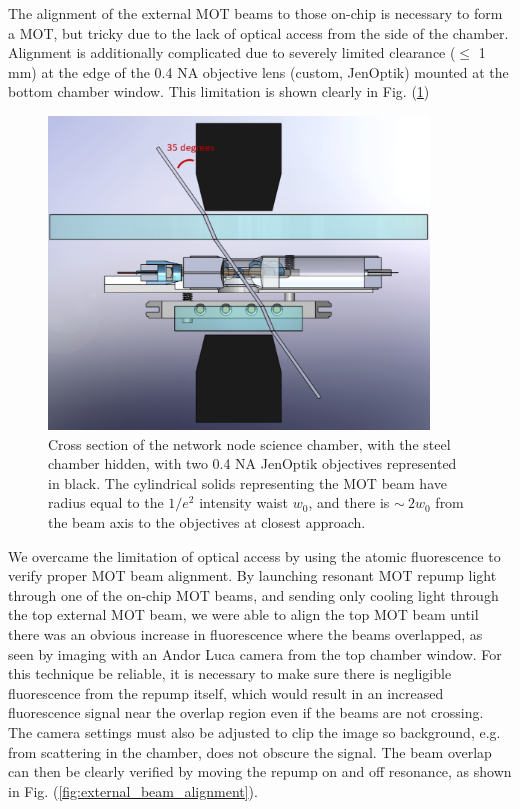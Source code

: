 The alignment of the external MOT beams to those on-chip is necessary to form a MOT,
but tricky due to the lack of optical access from the side of the chamber. Alignment is additionally complicated due to severely limited clearance ($\leq$ 1 mm) at the edge of the 0.4 NA objective lens (custom, JenOptik) mounted at the bottom chamber window. This limitation is shown clearly in Fig. (\ref{fig:chamber_cross_section})
\begin{figure}[!ht]
    \centering
    \includegraphics[width=0.9\textwidth]{Images/chamber_cross_section.pdf}
    \caption{Cross section of the network node science chamber, with the steel chamber hidden, with two 0.4 NA JenOptik objectives represented in black. The cylindrical solids representing the MOT beam have radius equal to the $1/e^2$ intensity waist $w_0$, and there is $\sim~2w_0$ from the beam axis to the objectives at closest approach.}
    \label{fig:chamber_cross_section}
\end{figure}
We overcame the limitation of optical access by using the atomic fluorescence to verify proper MOT beam alignment. By launching resonant MOT repump light through one of the on-chip MOT beams, and sending only cooling light through the top external MOT beam, we were able to align the top MOT beam until there was an obvious increase in fluorescence where the beams overlapped, as seen by imaging with an Andor Luca camera from the top chamber window. For this technique be reliable, it is necessary to make sure there is negligible fluorescence from the repump itself, which would result in an increased fluorescence signal near the overlap region even if the beams are not crossing. The camera settings must also be adjusted to clip the image so background, e.g. from scattering in the chamber, does not obscure the signal. The beam overlap can then be clearly verified by moving the repump on and off resonance, as shown in Fig. (\ref{fig:external_beam_alignment}).
